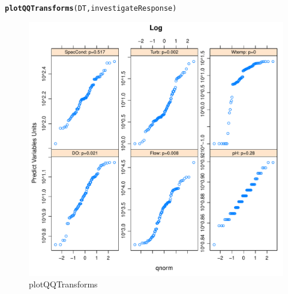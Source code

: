 \documentclass[a4paper,11pt]{article}\usepackage[]{graphicx}\usepackage[]{color}
\makeatletter
\def\maxwidth{ %
  \ifdim\Gin@nat@width>\linewidth
    \linewidth
  \else
    \Gin@nat@width
  \fi
}
\newcommand{\hlstd}[1]{\textcolor[rgb]{0.345,0.345,0.345}{#1}}%
\newcommand{\hlkwd}[1]{\textcolor[rgb]{0.737,0.353,0.396}{\textbf{#1}}}%
\newenvironment{kframe}{%
 \def\at@end@of@kframe{}%
 \ifinner\ifhmode%
  \def\at@end@of@kframe{\end{minipage}}%
  \begin{minipage}{\columnwidth}%
 \fi\fi%
 \def\FrameCommand##1{\hskip\@totalleftmargin \hskip-\fboxsep
 \colorbox{shadecolor}{##1}\hskip-\fboxsep
     \hskip-\linewidth \hskip-\@totalleftmargin \hskip\columnwidth}%
 \MakeFramed {\advance\hsize-\width
   \@totalleftmargin\z@ \linewidth\hsize
   \@setminipage}}%
 {\par\unskip\endMakeFramed%
 \at@end@of@kframe}
\newenvironment{knitrout}{}{} %
\makeatother
\begin{document}
\begin{knitrout}
\color{fgcolor}\begin{kframe}
\begin{alltt}
\hlkwd{plotQQTransforms}\hlstd{(DT,investigateResponse)}
\end{alltt}
\end{kframe}\begin{figure}[]

\includegraphics[width=\maxwidth]{figure/plotQQTransforms1} \caption[plotQQTransforms]{plotQQTransforms\label{fig:plotQQTransforms1}}
\end{figure}

\begin{figure}[]


\end{figure}
\end{knitrout}
\end{document}
